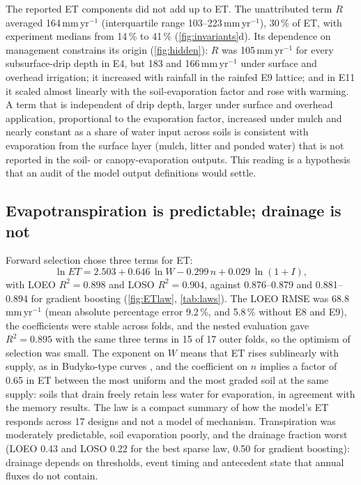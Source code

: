 \documentclass[review,12pt,authoryear]{elsarticle}
\begin{document}
The reported ET components did not add up to ET. The unattributed term $R$ averaged 164\,mm\,yr$^{-1}$ (interquartile range 103--223\,mm\,yr$^{-1}$), 30\,\% of ET, with experiment medians from 14\,\% to 41\,\% (\cref{fig:invariants}d). Its dependence on management constrains its origin (\cref{fig:hidden}): $R$ was 105\,mm\,yr$^{-1}$ for every subsurface-drip depth in E4, but 183 and 166\,mm\,yr$^{-1}$ under surface and overhead irrigation; it increased with rainfall in the rainfed E9 lattice; and in E11 it scaled almost linearly with the soil-evaporation factor and rose with warming. A term that is independent of drip depth, larger under surface and overhead application, proportional to the evaporation factor, increased under mulch and nearly constant as a share of water input across soils is consistent with evaporation from the surface layer (mulch, litter and ponded water) that is not reported in the soil- or canopy-evaporation outputs. This reading is a hypothesis that an audit of the model output definitions would settle.


\subsection{Evapotranspiration is predictable; drainage is not}
Forward selection chose three terms for ET:
\begin{equation}
\ln\mathit{ET}=2.503+0.646\,\ln W-0.299\,n+0.029\,\ln(1+I),
\label{eq:ETlaw}
\end{equation}
with LOEO $R^2=0.898$ and LOSO $R^2=0.904$, against 0.876--0.879 and 0.881--0.894 for gradient boosting (\cref{fig:ETlaw}, \cref{tab:laws}). The LOEO RMSE was 68.8\,mm\,yr$^{-1}$ (mean absolute percentage error 9.2\,\%, and 5.8\,\% without E8 and E9), the coefficients were stable across folds, and the nested evaluation gave $R^2=0.895$ with the same three terms in 15 of 17 outer folds, so the optimism of selection was small. The exponent on $W$ means that ET rises sublinearly with supply, as in Budyko-type curves \citep{Budyko1974,Milly1994,Zhang2001}, and the coefficient on $n$ implies a factor of 0.65 in ET between the most uniform and the most graded soil at the same supply: soils that drain freely retain less water for evaporation, in agreement with the memory results. The law is a compact summary of how the model's ET responds across 17 designs and not a model of mechanism. Transpiration was moderately predictable, soil evaporation poorly, and the drainage fraction worst (LOEO 0.43 and LOSO 0.22 for the best sparse law, 0.50 for gradient boosting): drainage depends on thresholds, event timing and antecedent state that annual fluxes do not contain.
\end{document}
